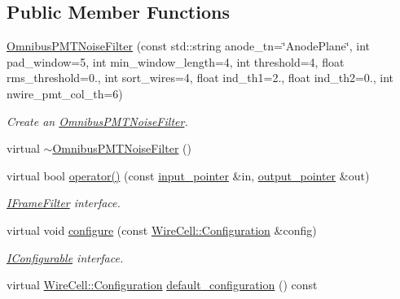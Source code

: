\subsection*{Public Member Functions}
\begin{DoxyCompactItemize}
\item 
\hyperlink{class_wire_cell_1_1_sig_proc_1_1_omnibus_p_m_t_noise_filter_a84ba13ca4bd78082f7d68110ed60f78d}{Omnibus\+P\+M\+T\+Noise\+Filter} (const std\+::string anode\+\_\+tn=\char`\"{}Anode\+Plane\char`\"{}, int pad\+\_\+window=5, int min\+\_\+window\+\_\+length=4, int threshold=4, float rms\+\_\+threshold=0., int sort\+\_\+wires=4, float ind\+\_\+th1=2., float ind\+\_\+th2=0., int nwire\+\_\+pmt\+\_\+col\+\_\+th=6)
\begin{DoxyCompactList}\small\item\em Create an \hyperlink{class_wire_cell_1_1_sig_proc_1_1_omnibus_p_m_t_noise_filter}{Omnibus\+P\+M\+T\+Noise\+Filter}. \end{DoxyCompactList}\item 
virtual \hyperlink{class_wire_cell_1_1_sig_proc_1_1_omnibus_p_m_t_noise_filter_afaf75627fa627e927e819f91012d0fcb}{$\sim$\+Omnibus\+P\+M\+T\+Noise\+Filter} ()
\item 
virtual bool \hyperlink{class_wire_cell_1_1_sig_proc_1_1_omnibus_p_m_t_noise_filter_ad33bf21dae5ad22503a33e6444057dcb}{operator()} (const \hyperlink{class_wire_cell_1_1_i_function_node_a55c0946156df9b712b8ad1a0b59b2db6}{input\+\_\+pointer} \&in, \hyperlink{class_wire_cell_1_1_i_function_node_afc02f1ec60d31aacddf64963f9ca650b}{output\+\_\+pointer} \&out)
\begin{DoxyCompactList}\small\item\em \hyperlink{class_wire_cell_1_1_i_frame_filter}{I\+Frame\+Filter} interface. \end{DoxyCompactList}\item 
virtual void \hyperlink{class_wire_cell_1_1_sig_proc_1_1_omnibus_p_m_t_noise_filter_aa8770493fc0243d6e15508e32592ed20}{configure} (const \hyperlink{namespace_wire_cell_a9f705541fc1d46c608b3d32c182333ee}{Wire\+Cell\+::\+Configuration} \&config)
\begin{DoxyCompactList}\small\item\em \hyperlink{class_wire_cell_1_1_i_configurable}{I\+Configurable} interface. \end{DoxyCompactList}\item 
virtual \hyperlink{namespace_wire_cell_a9f705541fc1d46c608b3d32c182333ee}{Wire\+Cell\+::\+Configuration} \hyperlink{class_wire_cell_1_1_sig_proc_1_1_omnibus_p_m_t_noise_filter_a6c7e54b7550bb06bfef58e7204c4eacc}{default\+\_\+configuration} () const

\end{DoxyCompactItemize}
